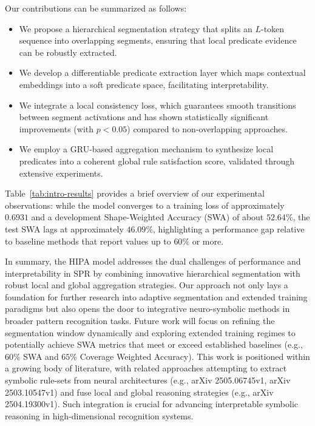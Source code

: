 \documentclass[11pt]{article}
\begin{document}
Our contributions can be summarized as follows:
\begin{itemize}
    \item We propose a hierarchical segmentation strategy that splits an $L$-token sequence into overlapping segments, ensuring that local predicate evidence can be robustly extracted.
    \item We develop a differentiable predicate extraction layer which maps contextual embeddings into a soft predicate space, facilitating interpretability.
    \item We integrate a local consistency loss, which guarantees smooth transitions between segment activations and has shown statistically significant improvements (with $p<0.05$) compared to non-overlapping approaches.
    \item We employ a GRU-based aggregation mechanism to synthesize local predicates into a coherent global rule satisfaction score, validated through extensive experiments.
\end{itemize}
Table~\ref{tab:intro-results} provides a brief overview of our experimental observations: while the model converges to a training loss of approximately $0.6931$ and a development Shape-Weighted Accuracy (SWA) of about $52.64\%$, the test SWA lags at approximately $46.09\%$, highlighting a performance gap relative to baseline methods that report values up to $60\%$ or more.

In summary, the HIPA model addresses the dual challenges of performance and interpretability in SPR by combining innovative hierarchical segmentation with robust local and global aggregation strategies. Our approach not only lays a foundation for further research into adaptive segmentation and extended training paradigms but also opens the door to integrative neuro-symbolic methods in broader pattern recognition tasks. Future work will focus on refining the segmentation window dynamically and exploring extended training regimes to potentially achieve SWA metrics that meet or exceed established baselines (e.g., $60\%$ SWA and $65\%$ Coverage Weighted Accuracy). This work is positioned within a growing body of literature, with related approaches attempting to extract symbolic rule-sets from neural architectures (e.g., arXiv 2505.06745v1, arXiv 2503.10547v1) and fuse local and global reasoning strategies (e.g., arXiv 2504.19300v1). Such integration is crucial for advancing interpretable symbolic reasoning in high-dimensional recognition systems.
\end{document}
